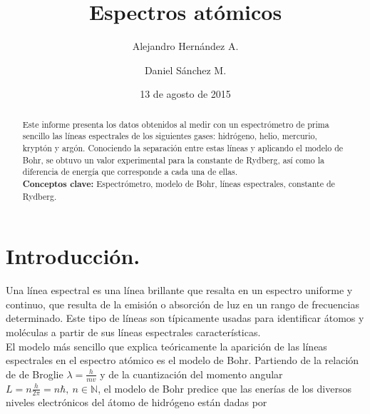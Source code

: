 \documentclass[prb,aps,twocolumn,preprintnumbers,amsmath,amssymb]{revtex4}
\begin{document}
\title{Espectros atómicos}%

\author{Alejandro Hernández A.}%
\author{Daniel Sánchez M.}%
%


\date{13 de agosto de 2015}%

\begin{abstract}
Este informe presenta los datos obtenidos al medir con un espectrómetro de prima sencillo las líneas espectrales de los siguientes gases: hidrógeno, helio, mercurio, kryptón y argón. Conociendo  la separación entre estas líneas y aplicando el modelo de Bohr, se obtuvo un valor experimental para la constante de Rydberg, así como la diferencia de energía que corresponde a cada una de ellas.
\\

\noindent \textbf{Conceptos clave:} Espectrómetro, modelo de Bohr, líneas espectrales, constante de Rydberg.
\end{abstract}
                             
\maketitle

\section{\label{sec:level1}Introducción.}

Una línea espectral es una línea brillante que resalta en un espectro uniforme y continuo, que resulta de la emisión o absorción de luz en un rango de frecuencias determinado. Este tipo de líneas son típicamente usadas para identificar átomos y moléculas a partir de sus líneas espectrales características.\\

El modelo más sencillo que explica teóricamente la aparición de las líneas espectrales en el espectro atómico es el modelo de Bohr. Partiendo de la relación de de Broglie $\lambda = \frac{h}{mv}$ y de la cuantización del momento angular $L = n\frac{h}{2\pi} = n\hbar, \ n \in \mathbb{N}$, el modelo de Bohr predice que las enerías de los diversos niveles electrónicos del átomo de hidrógeno están dadas por
\end{document}
